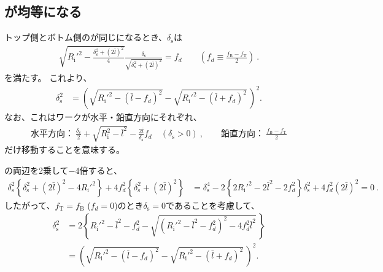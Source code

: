 \subsection{\ReAlocationLength が均等になる\SpacerThickness}
トップ側とボトム側の\AlocationLength が同じになるとき、$\delta_\mathrm s$は
\begin{align}
  \label{eq:condtionequalalocationSpacer}
  \sqrt{R_\mathrm i'^2-\frac{\delta_\mathrm s^2+(2\bar l)^2}4}\frac{\delta_\mathrm s}{\sqrt{\delta_\mathrm s^2+(2\bar l)^2}} = f_d \qquad
  \left(f_d \equiv \frac{f_\mathrm B-f_\mathrm T}2\right)\ .
\end{align}
を満たす。
これより、
\begin{align*}
  \delta_\mathrm s^2
  &= \left(\sqrt{R_\mathrm i'^2-(\bar l-f_d)^2}-\sqrt{R_\mathrm i'^2-(\bar l+f_d)^2}\,\right)^2.
\end{align*}
なお、これはワークが水平・鉛直方向にそれぞれ、
\begin{align*}
  \text{水平方向：}~\frac{\delta_\mathrm s}2+\sqrt{R_\mathrm i^2-\bar l^2}-\frac{2\bar l}{\delta_\mathrm s}f_d\quad(\delta_\mathrm s>0)\ , \qquad
  \text{鉛直方向：}~\frac{f_\mathrm B-f_\mathrm T}2
\end{align*}
だけ移動することを意味する。
\begin{hosoku}
の両辺を2乗して$-4$倍すると、
\begin{align*}
  \delta_\mathrm s^2\left\{\delta_\mathrm s^2+(2\bar l)^2-4R_\mathrm i'^2\right\}+4f_d^2\left\{\delta_\mathrm s^2+(2\bar l)^2\right\}
  & = \delta_\mathrm s^4-2\left\{2R_\mathrm i'^2-2\bar l^2-2f_d^2\right\}\delta_\mathrm s^2+4f_d^2(2\bar l)^2
    = 0\ .
\end{align*}
したがって、$f_\mathrm T = f_\mathrm B$ ($f_d = 0$)のとき$\delta_\mathrm s = 0$であることを考慮して、
\begin{align*}
  \delta_\mathrm s^2
  &= 2\left\{
       R_\mathrm i'^2-\bar l^2-f_d^2-\sqrt{\left(R_\mathrm i'^2-\bar l^2-f_d^2\right)^2-4f_d^2\bar l^2}\,
     \right\}\\
  &= \left(\sqrt{R_\mathrm i'^2-(\bar l-f_d)^2}-\sqrt{R_\mathrm i'^2-(\bar l+f_d)^2}\,\right)^2.
\end{align*}
\end{hosoku}

